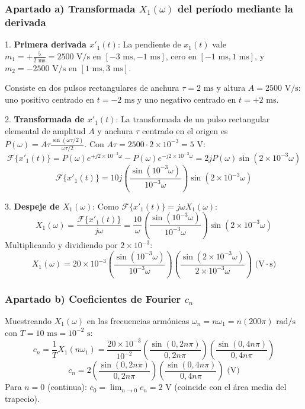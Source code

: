 \begin{resolucion}
\subsubsection*{Apartado a) Transformada $X_1(\omega)$ del período mediante la derivada}

1. \textbf{Primera derivada $x'_1(t)$}:
   La pendiente de $x_1(t)$ vale $m_1 = +\frac{5}{2\text{ ms}} = 2500\text{ V/s}$ en $[-3\text{ ms}, -1\text{ ms}]$, cero en $[-1\text{ ms}, 1\text{ ms}]$, y $m_2 = -2500\text{ V/s}$ en $[1\text{ ms}, 3\text{ ms}]$.
   
   Consiste en dos pulsos rectangulares de anchura $\tau = 2\text{ ms}$ y altura $A = 2500\text{ V/s}$: uno positivo centrado en $t = -2\text{ ms}$ y uno negativo centrado en $t = +2\text{ ms}$.

2. \textbf{Transformada de $x'_1(t)$}:
   La transformada de un pulso rectangular elemental de amplitud $A$ y anchura $\tau$ centrado en el origen es $P(\omega) = A \tau \frac{\sin(\omega\tau/2)}{\omega\tau/2}$.
   Con $A\tau = 2500 \cdot 2\times 10^{-3} = 5\text{ V}$:
   \[
   \mathcal{F}\{x'_1(t)\} = P(\omega) e^{+j 2\times 10^{-3}\omega} - P(\omega) e^{-j 2\times 10^{-3}\omega} = 2j P(\omega) \sin(2\times 10^{-3}\omega)
   \]
   \[
   \mathcal{F}\{x'_1(t)\} = 10j \left( \frac{\sin(10^{-3}\omega)}{10^{-3}\omega} \right) \sin(2\times 10^{-3}\omega)
   \]

3. \textbf{Despeje de $X_1(\omega)$}:
   Como $\mathcal{F}\{x'_1(t)\} = j\omega X_1(\omega)$:
   \[
   X_1(\omega) = \frac{\mathcal{F}\{x'_1(t)\}}{j\omega} = \frac{10}{\omega} \left( \frac{\sin(10^{-3}\omega)}{10^{-3}\omega} \right) \sin(2\times 10^{-3}\omega)
   \]
   Multiplicando y dividiendo por $2\times 10^{-3}$:
   \[
   X_1(\omega) = 20\times 10^{-3} \left( \frac{\sin(10^{-3}\omega)}{10^{-3}\omega} \right) \left( \frac{\sin(2\times 10^{-3}\omega)}{2\times 10^{-3}\omega} \right) \text{ (V}\cdot\text{s)}
   \]

\subsubsection*{Apartado b) Coeficientes de Fourier $c_n$}

Muestreando $X_1(\omega)$ en las frecuencias armónicas $\omega_n = n \omega_1 = n (200\pi)\text{ rad/s}$ con $T = 10\text{ ms} = 10^{-2}\text{ s}$:
\[
c_n = \frac{1}{T} X_1(n\omega_1) = \frac{20\times 10^{-3}}{10^{-2}} \left( \frac{\sin(0{,}2 n \pi)}{0{,}2 n \pi} \right) \left( \frac{\sin(0{,}4 n \pi)}{0{,}4 n \pi} \right)
\]
\[
c_n = 2 \left( \frac{\sin(0{,}2 n \pi)}{0{,}2 n \pi} \right) \left( \frac{\sin(0{,}4 n \pi)}{0{,}4 n \pi} \right) \text{ (V)}
\]
Para $n = 0$ (continua): $c_0 = \lim_{n\to 0} c_n = 2\text{ V}$ (coincide con el área media del trapecio).


\end{resolucion}
